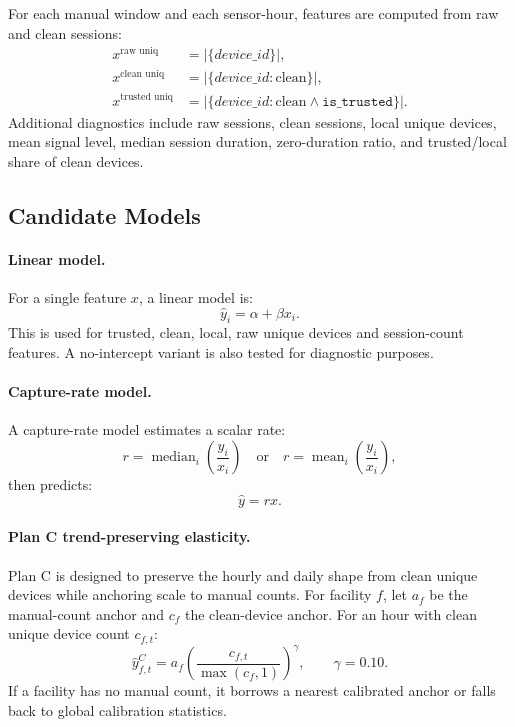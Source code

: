 \documentclass[11pt,a4paper]{article}
\begin{document}
For each manual window and each sensor-hour, features are computed from raw and clean sessions:
\begin{align*}
  x^{\text{raw uniq}} &= |\{device\_id\}|,\\
  x^{\text{clean uniq}} &= |\{device\_id: \text{clean}\}|,\\
  x^{\text{trusted uniq}} &= |\{device\_id: \text{clean} \wedge \texttt{is\_trusted}\}|.
\end{align*}
Additional diagnostics include raw sessions, clean sessions, local unique devices, mean signal level, median session duration, zero-duration ratio, and trusted/local share of clean devices.

\subsection{Candidate Models}

\paragraph{Linear model.}
For a single feature \(x\), a linear model is:
\[
  \hat{y}_i = \alpha + \beta x_i.
\]
This is used for trusted, clean, local, raw unique devices and session-count features. A no-intercept variant is also tested for diagnostic purposes.

\paragraph{Capture-rate model.}
A capture-rate model estimates a scalar rate:
\[
  r = \operatorname{median}_i\left(\frac{y_i}{x_i}\right)
  \quad\text{or}\quad
  r = \operatorname{mean}_i\left(\frac{y_i}{x_i}\right),
\]
then predicts:
\[
  \hat{y} = r x.
\]

\paragraph{Plan C trend-preserving elasticity.}
Plan C is designed to preserve the hourly and daily shape from clean unique devices while anchoring scale to manual counts. For facility \(f\), let \(a_f\) be the manual-count anchor and \(c_f\) the clean-device anchor. For an hour with clean unique device count \(c_{f,t}\):
\[
  \hat{y}^{C}_{f,t}
  =
  a_f \left(\frac{c_{f,t}}{\max(c_f,1)}\right)^{\gamma},
  \qquad \gamma = 0.10.
\]
If a facility has no manual count, it borrows a nearest calibrated anchor or falls back to global calibration statistics.
\end{document}
